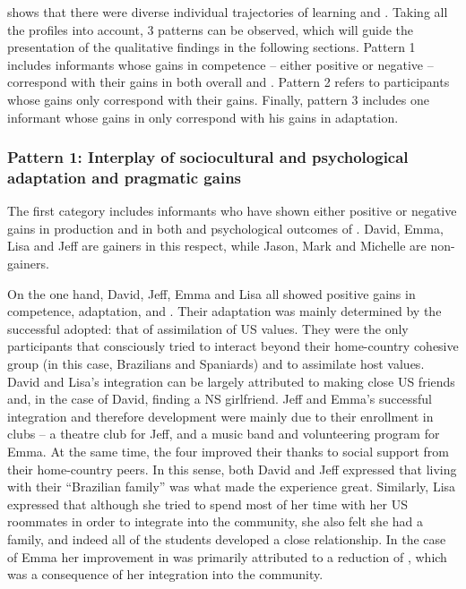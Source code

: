 \documentclass[output=paper]{langsci/langscibook}
\begin{document}
\largerpage
{} shows that there were diverse individual trajectories of  learning and . Taking all the profiles into account, 3 patterns can be observed, which will guide the presentation of the qualitative findings in the following sections. Pattern 1 includes informants whose gains in  competence – either positive or negative – correspond with their gains in both overall  and . Pattern 2 refers to participants whose  gains only correspond with their  gains. Finally, pattern 3 includes one informant whose gains in  only correspond with his gains in  adaptation.


\subsubsection{Pattern 1: Interplay of sociocultural and psychological adaptation and pragmatic gains}

The first category includes informants who have shown either positive or negative gains in  production and in both  and psychological outcomes of . David, Emma, Lisa and Jeff are gainers in this respect, while Jason, Mark and Michelle are non-gainers.

On the one hand, David, Jeff, Emma and Lisa all showed positive gains in  competence,  adaptation, and . Their  adaptation was mainly determined by the successful  adopted: that of assimilation of US  values. They were the only participants that consciously tried to interact beyond their home-country cohesive group (in this case, Brazilians and Spaniards) and to assimilate host values. David and Lisa’s integration can be largely attributed to making close US friends and, in the case of David, finding a NS girlfriend. Jeff and Emma’s successful integration and therefore  development were mainly due to their enrollment in clubs – a theatre club for Jeff, and a music band and volunteering program for Emma. At the same time, the four improved their  thanks to social support from their home-country peers. In this sense, both David and Jeff expressed that living with their “Brazilian family” was what made the experience great. Similarly, Lisa expressed that although she tried to spend most of her time with her US roommates in order to integrate into the community, she also felt she had a  family, and indeed all of the  students developed a close relationship. In the case of Emma her improvement in  was primarily attributed to a reduction of , which was a consequence of her integration into the  community.
\end{document}

